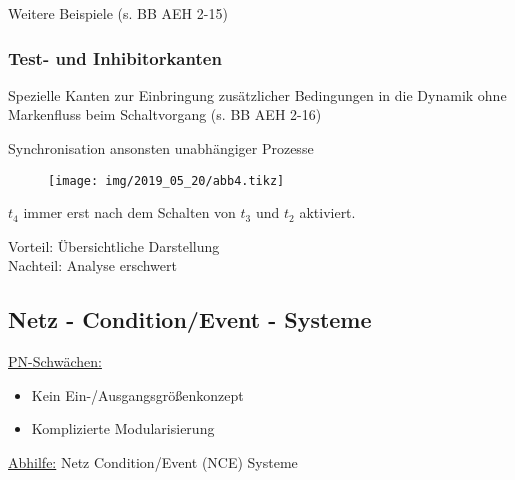 Weitere Beispiele (s. BB AEH 2-15)

\subsubsection{Test- und Inhibitorkanten}
Spezielle Kanten zur Einbringung zusätzlicher Bedingungen in die Dynamik ohne Markenfluss beim Schaltvorgang (s. BB AEH 2-16)

\beispiel Synchronisation ansonsten unabhängiger Prozesse
\begin{figure}[H]
	\centering
	\texttt{[image: img/2019\_05\_20/abb4.tikz]}
\end{figure}

$t_4$ immer erst nach dem Schalten von $t_3$ und $t_2$ aktiviert.

Vorteil: Übersichtliche Darstellung\\
Nachteil: Analyse erschwert




\subsection{Netz - Condition/Event - Systeme}
\underline{PN-Schwächen:}
\begin{itemize}
	\item Kein Ein-/Ausgangsgrößenkonzept
	\item Komplizierte Modularisierung
\end{itemize}

\underline{Abhilfe:} Netz Condition/Event (NCE) Systeme

